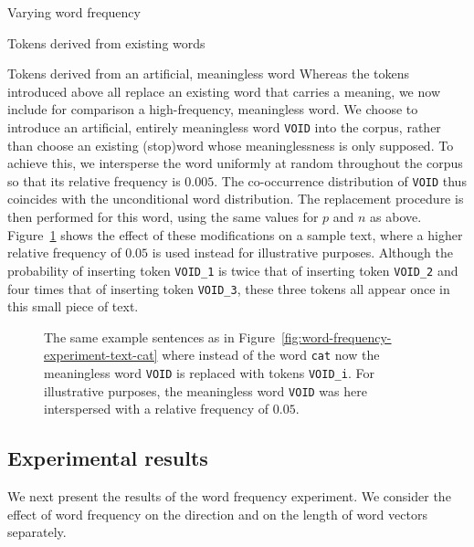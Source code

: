 \documentclass{article} %
\newcommand{\word}[1]{\texttt{#1}}
\begin{document}
\begin{section}{Varying word frequency}
\begin{subsection}{Tokens derived from existing words}
\end{subsection}

\begin{subsection}{Tokens derived from an artificial, meaningless word}
\label{WFVEmeaningless}
Whereas the tokens introduced above all replace an existing word that
carries a meaning, we now include for comparison a high-frequency,
meaningless word.  We choose to introduce an artificial, entirely
meaningless word \word{VOID} into the corpus, rather than choose an
existing (stop)word whose meaninglessness is only supposed.  To achieve
this, we intersperse the word uniformly at random throughout the corpus
so that its relative frequency is $0.005$.  The co-occurrence
distribution of \word{VOID} thus coincides with the unconditional word
distribution.  The replacement procedure is then performed for this
word, using the same values for $p$ and $n$ as above.
Figure~\ref{fig:word-frequency-experiment-text-void} shows the effect of
these modifications on a sample text, where a higher relative frequency
of $0.05$ is used instead for illustrative purposes.  Although the probability of inserting token
\word{VOID\_1} is twice that of inserting token \word{VOID\_2} and four
times that of inserting token \word{VOID\_3}, these three tokens all
appear once in this small piece of text.

\begin{figure}
	\begin{mdframed}
	
	\end{mdframed}
	\caption{The same example sentences as in
          Figure~\ref{fig:word-frequency-experiment-text-cat} where
          instead of the word \word{cat} now the meaningless word
          \word{VOID} is replaced with tokens \word{VOID\_i}.  For
          illustrative purposes, the meaningless word \word{VOID} was
          here interspersed with a relative frequency of
          $0.05$. }
	\label{fig:word-frequency-experiment-text-void}
\end{figure}
\end{subsection}



\subsection{Experimental results}\label{WFVE-results}
We next present the results of the word frequency experiment. We
consider the effect of word frequency on the direction and on the length
of word vectors separately.


\end{section}
\end{document}
